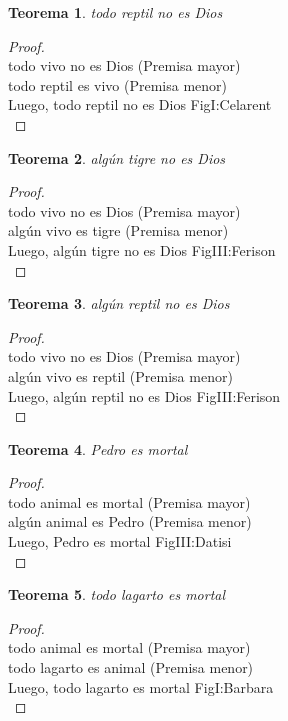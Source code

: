 ﻿\documentclass[12pt]{book}
\newtheorem{theorem}{Teorema}[chapter]
\newtheorem{proof}{Demostración}
\begin{document}
\begin{theorem}
todo reptil no es Dios
\label{th: 92}
\end{theorem}\begin{proof}\\todo vivo no es Dios	 (Premisa mayor) \\todo reptil es vivo	 (Premisa menor) \\Luego, todo reptil no es Dios	FigI:Celarent \\ \end{proof}
\begin{theorem}
algún tigre no es Dios
\label{th: 93}
\end{theorem}\begin{proof}\\todo vivo no es Dios	 (Premisa mayor) \\algún vivo es tigre	 (Premisa menor) \\Luego, algún tigre no es Dios	FigIII:Ferison \\ \end{proof}
\begin{theorem}
algún reptil no es Dios
\label{th: 94}
\end{theorem}\begin{proof}\\todo vivo no es Dios	 (Premisa mayor) \\algún vivo es reptil	 (Premisa menor) \\Luego, algún reptil no es Dios	FigIII:Ferison \\ \end{proof}
\begin{theorem}
Pedro es mortal
\label{th: 95}
\end{theorem}\begin{proof}\\todo animal es mortal	 (Premisa mayor) \\algún animal es Pedro	 (Premisa menor) \\Luego, Pedro es mortal	FigIII:Datisi \\ \end{proof}
\begin{theorem}
todo lagarto es mortal
\label{th: 96}
\end{theorem}\begin{proof}\\todo animal es mortal	 (Premisa mayor) \\todo lagarto es animal	 (Premisa menor) \\Luego, todo lagarto es mortal	FigI:Barbara \\ \end{proof}
\end{document}
